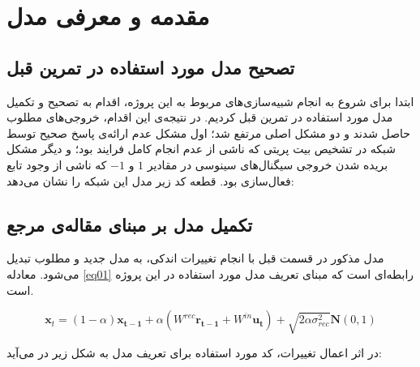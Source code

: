 \documentclass[a4paper]{article}
\begin{document}
\begin{titlepage}
\begin{center}
	\end{center}
	
	\thispagestyle{empty}
\end{titlepage}	

	\large
\section{مقدمه و معرفی مدل}
\subsection{تصحیح مدل مورد استفاده در تمرین قبل}
ابتدا برای شروع به انجام شبیه‌سازی‌های مربوط به این پروژه، اقدام به تصحیح و تکمیل مدل مورد استفاده در تمرین قبل کردیم. در نتیجه‌ی این اقدام، خروجی‌های مطلوب حاصل شدند و دو مشکل اصلی مرتفع شد؛ اول مشکل عدم ارائه‌ی پاسخ صحیح توسط شبکه در تشخیص بیت پریتی که ناشی از عدم انجام کامل فرایند 
بود؛ و دیگر مشکل بریده شدن خروجی سیگنال‌های سینوسی در مقادیر $1$ و $-1$ که ناشی از وجود تابع فعال‌سازی 
بود.
قطعه کد زیر مدل این شبکه را نشان می‌دهد:
 \begin{normalsize}
	\begin{latin}
		\texttt{}
	\end{latin}
\end{normalsize}

\subsection{تکمیل مدل بر مبنای مقاله‌ی مرجع}
مدل مذکور در قسمت قبل با انجام تغییرات اندکی، به مدل جدید و مطلوب تبدیل می‌شود. معادله \ref{eq01} رابطه‌ای است که مبنای تعریف مدل مورد استفاده در این پروژه است.

	\begin{equation}
{\mathbf{x}_t} = (1-\alpha)\mathbf{x_{t-1}}+\alpha(W^{rec}\mathbf{r_{t-1}}+W^{in}\mathbf{u_t})+\sqrt{2\alpha\sigma^2_{rec}}\boldsymbol{N}(0,1) 
\label{eq01}
\end{equation}

در اثر اعمال تغییرات، کد مورد استفاده برای تعریف مدل به شکل زیر در می‌آید:
 \begin{normalsize}
	\begin{latin}
		\texttt{}
	\end{latin}
\end{normalsize}
\end{document}
